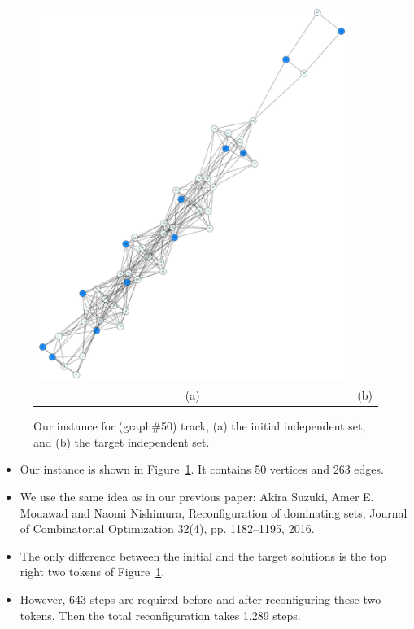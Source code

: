 \documentclass{article}
\begin{document}
\begin{figure}[t]
\begin{tabular}{cc}
\begin{minipage}[t]{0.5\hsize}
				\includegraphics[scale=0.2]{50_t.png}
			\end{minipage}
		\\
		(a)
		&
		(b)
		\end{tabular}
		\caption{Our instance for (graph\#50) track, (a) the initial independent set, and (b) the target independent set.}
		\label{figure_50instance}
	\end{figure}
\begin{itemize}
\item Our instance is shown in Figure~\ref{figure_50instance}. It contains 50 vertices and 263 edges.
\item We use the same idea as in our previous paper: Akira Suzuki, Amer E. Mouawad and Naomi Nishimura, Reconfiguration of dominating sets, Journal of Combinatorial Optimization 32(4), pp. 1182--1195, 2016.
\item The only difference between the initial and the target solutions is the top right two tokens of Figure~\ref{figure_50instance}.
\item However, 643 steps are required before and after reconfiguring these two tokens. Then the total reconfiguration takes 1,289 steps.
\end{itemize}
\end{document}

